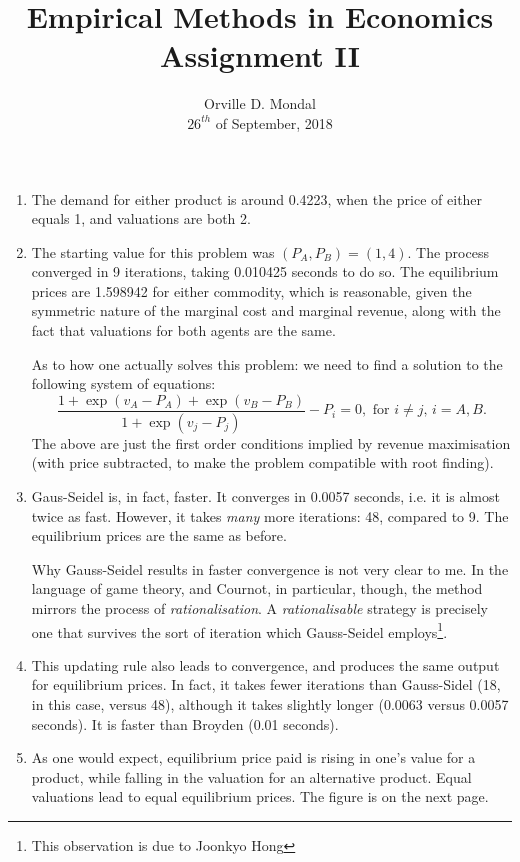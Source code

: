 \documentclass[12pt,a4paper]{article}
\title{Empirical Methods in Economics\\\small{Assignment II}}
\date{Orville D. Mondal\\ $26^{th}$ of September, 2018\vspace{-3ex}}
\begin{document}
\maketitle
\begin{enumerate}
\item The demand for either product is around 0.4223, when the price of either equals 1, and valuations are both 2.
\item The starting value for this problem was $(P_{A},P_{B})=(1,4)$. The process converged in 9 iterations, taking 0.010425 seconds to do so. The equilibrium prices are 1.598942 for either commodity, which is reasonable, given the symmetric nature of the marginal cost and marginal revenue, along with the fact that valuations for both agents are the same.\par As to how one actually solves this problem: we need to find a solution to the following system of equations:
    \[\frac{1+\exp(v_{A}-P_{A})+\exp(v_{B}-P_{B})}{1+\exp(v_{j}-P_{j})}-P_{i}=0,\text{ for $i\neq j$, $i=A,B$.}\]
The above are just the first order conditions implied by revenue maximisation (with price subtracted, to make the problem compatible with root finding).
\item Gaus-Seidel is, in fact, faster. It converges in 0.0057 seconds, i.e. it is almost twice as fast. However, it takes \emph{many} more iterations: 48, compared to 9. The equilibrium prices are the same as before. \par Why Gauss-Seidel results in faster convergence is not very clear to me. In the language of game theory, and Cournot, in particular, though, the method mirrors the process of \emph{rationalisation}. A \emph{rationalisable} strategy is precisely one that survives the sort of iteration which Gauss-Seidel employs\footnote{This observation is due to Joonkyo Hong}.
\item This updating rule also leads to convergence, and produces the same output for equilibrium prices. In fact, it takes fewer iterations than Gauss-Sidel (18, in this case, versus 48), although it takes slightly longer (0.0063 versus 0.0057 seconds). It is faster than Broyden (0.01 seconds).
\item As one would expect, equilibrium price paid is rising in one's value for a product, while falling in the valuation for an alternative product. Equal valuations lead to equal equilibrium prices. The figure is on the next page.\newpage
\begin{figure}
\centering

\end{figure}
\end{enumerate}
\end{document}
